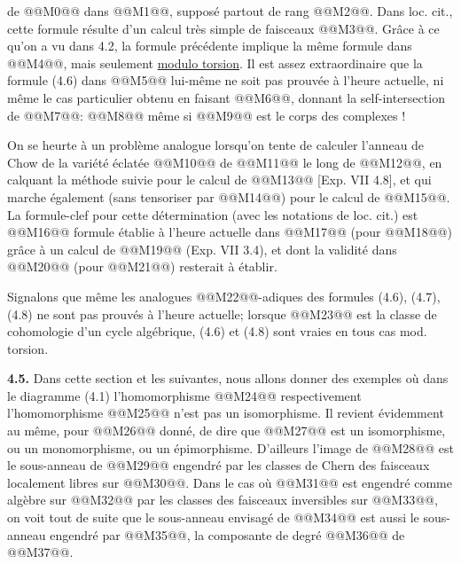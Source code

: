 
de @@M0@@
dans @@M1@@, supposé partout de rang @@M2@@. Dans loc. cit., cette formule résulte d'un calcul très simple de faisceaux @@M3@@. Grâce à ce qu'on a vu dans 4.2, la formule précédente implique la même formule dans @@M4@@, mais seulement \uline{modulo torsion}. Il est assez extraordinaire que la formule (4.6) dans @@M5@@ lui-même ne soit pas prouvée à l'heure actuelle, ni même le cas particulier obtenu en faisant @@M6@@, donnant la self-intersection de @@M7@@:
@@M8@@
même si @@M9@@ est le corps des complexes !

On se heurte à un problème analogue lorsqu'on tente de calculer l'anneau de Chow de la variété éclatée @@M10@@ de @@M11@@ le long de @@M12@@, en calquant la méthode suivie pour le calcul de @@M13@@ [Exp. VII 4.8], et qui marche également (sans tensoriser par @@M14@@) pour le calcul de @@M15@@. La formule-clef pour cette détermination (avec les notations de loc. cit.) est
@@M16@@
formule établie à l'heure actuelle dans @@M17@@ (pour @@M18@@) grâce à un calcul de @@M19@@ (Exp. VII 3.4), et dont la validité dans @@M20@@ (pour @@M21@@) resterait à établir.

Signalons que même les analogues @@M22@@-adiques des formules (4.6), (4.7), (4.8) ne sont pas prouvés à l'heure actuelle; lorsque @@M23@@ est la classe de cohomologie d'un cycle algébrique, (4.6) et (4.8) sont vraies en tous cas mod. torsion.

\textbf{4.5.} Dans cette section et les suivantes, nous allons donner des exemples où dans le diagramme (4.1) l'homomorphisme @@M24@@ respectivement l'homomorphisme @@M25@@ n'est pas un isomorphisme. Il revient évidemment au même, pour @@M26@@ donné, de dire que
@@M27@@
est un isomorphisme, ou un monomorphisme, ou un épimorphisme. D'ailleurs l'image de @@M28@@ est le sous-anneau de @@M29@@ engendré par les classes de Chern des faisceaux localement libres sur @@M30@@. Dans le cas où @@M31@@ est engendré comme algèbre sur @@M32@@ par les classes des faisceaux inversibles sur @@M33@@, on voit tout de suite que le sous-anneau envisagé de @@M34@@ est aussi le sous-anneau engendré par @@M35@@, la composante de degré @@M36@@ de @@M37@@.
